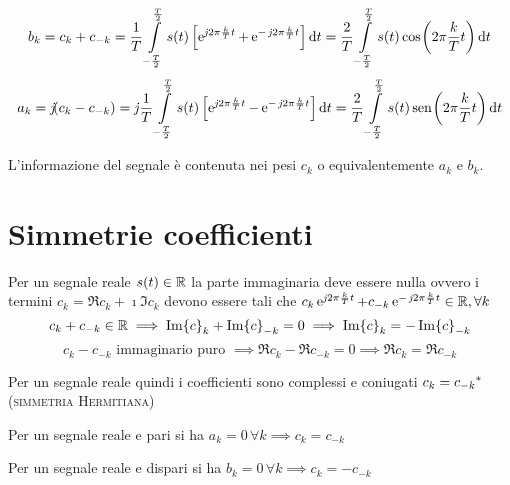 \[b_k=c_k+c_{-k}=\frac{1}{T}\intd{-\frac{T}{2}}{\frac{T}{2}}{s(t)\left[\e{\imath 2\pi\frac{k}{T}t}+\e{-\imath 2\pi\frac{k}{T}t}\right]}{t}=\frac{2}{T}\intd{-\frac{T}{2}}{\frac{T}{2}}{s(t)\cos{2\pi\frac{k}{T}t}}{t} \]
\[a_k=\imath(c_k-c_{-k})=\imath\frac{1}{T}\intd{-\frac{T}{2}}{\frac{T}{2}}{s(t)\left[\e{\imath 2\pi\frac{k}{T}t}-\e{-\imath 2\pi\frac{k}{T}t}\right]}{t}=\frac{2}{T}\intd{-\frac{T}{2}}{\frac{T}{2}}{s(t)\sen{2\pi\frac{k}{T}t}}{t} \]

\begin{nota}L'informazione del segnale è contenuta nei pesi $c_k$ o equivalentemente $a_k$ e $b_k$.
\end{nota}

\section{Simmetrie coefficienti}
Per un segnale reale $s(t)\in\R$ la parte immaginaria deve essere nulla ovvero i termini $c_k=\Re c_k + \imath \Im c_k$ devono essere tali che $c_k \e{\imath 2\pi\frac{k}{T}t}+ c_{-k}\e{-\imath 2\pi\frac{k}{T}t}\in\R,\forall k$ 
\[c_k+c_{-k}\in\R \implies \Im c_k+\Im c_{-k}=0 \implies \Im c_k=-\Im c_{-k}\]
\[c_k-c_{-k} \text{ immaginario puro } \implies \Re c_k -\Re c_{-k}=0 \implies \Re c_k=\Re c_{-k} \]

Per un segnale reale quindi i coefficienti sono complessi e coniugati $c_k=\conj{c_{-k}}$ (\textsc{simmetria Hermitiana})

Per un segnale reale e pari si ha $a_k=0\,\forall k \implies c_k=c_{-k}$ 

Per un segnale reale e dispari si ha $b_k=0\,\forall k \implies c_k=-c_{-k}$

